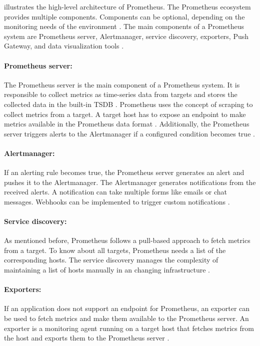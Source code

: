  illustrates the high-level architecture of Prometheus.
The Prometheus ecosystem provides multiple components. Components can be optional, depending on the monitoring needs of the environment \cite{Bastos2019Prom}. The main components of a Prometheus system are Prometheus server, Alertmanager, service discovery, exporters, Push Gateway, and data visualization tools \cite{Prom2020Docs}.


\paragraph{Prometheus server:} 
The Prometheus server is the main component of a Prometheus system. It is responsible to collect metrics as time-series data from targets and stores the collected data in the built-in TSDB \cite{Bastos2019Prom}. Prometheus uses the concept of scraping to collect metrics from a target. A target host has to expose an endpoint to make metrics available in the Prometheus data format \cite{Pandey2020Monitoring}. Additionally, the Prometheus server triggers alerts to the Alertmanager if a configured condition becomes true \cite{Prom2020Docs}.


\paragraph{Alertmanager:}
If an alerting rule becomes true, the Prometheus server generates an alert and pushes it to the Alertmanager. The Alertmanager generates notifications from the received alerts. A notification can take multiple forms like emails or chat messages. Webhooks can be implemented to trigger custom notifications \cite{Bastos2019Prom}.


\paragraph{Service discovery:}
As mentioned before, Prometheus follows a pull-based approach to fetch metrics from a target. To know about all targets, Prometheus needs a list of the corresponding hosts. The service discovery manages the complexity of maintaining a list of hosts manually in an changing infrastructure \cite{Bastos2019Prom}.


\paragraph{Exporters:}
If an application does not support an endpoint for Prometheus, an exporter can be used to fetch metrics and make them available to the Prometheus server. An exporter is a monitoring agent running on a target host that fetches metrics from the host and exports them to the Prometheus server \cite{Pandey2020Monitoring}.


